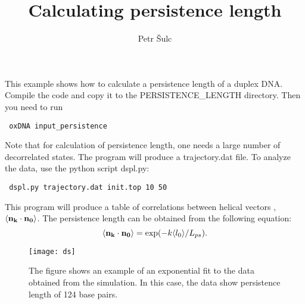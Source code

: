 \documentclass[a4paper,11pt]{article}
\title{Calculating persistence length}
\author{Petr \v{S}ulc}
\begin{document}
\maketitle
This example shows how to calculate a persistence length of a duplex DNA. Compile the code and copy it to the PERSISTENCE\_LENGTH directory.
Then you need to run 

\begin{verbatim}
 oxDNA input_persistence
\end{verbatim}

Note that for calculation of persistence length, one needs a large number of decorrelated states. The program will produce a trajectory.dat file. To analyze the data, use the python script 
dspl.py:
\begin{verbatim}
 dspl.py trajectory.dat init.top 10 50
\end{verbatim}
This program will produce a table of correlations between helical vectors , $\langle {\bf n_k} \cdot {\bf n_0} \rangle$. The persistence length can be obtained from the following equation:
\begin{equation}
\langle {\bf n_k} \cdot {\bf n_0} \rangle = \exp(- k \langle l_0 \rangle /L_{ps}).
\label{exp_decay}
\end{equation}


\begin{figure}
\centering
\texttt{[image: ds]}
\caption{The figure shows an example of an exponential fit to the data obtained from the simulation. In this case, the data show persistence length of 124 base pairs.}
\label{fig_fray}
\end{figure}
\end{document}

